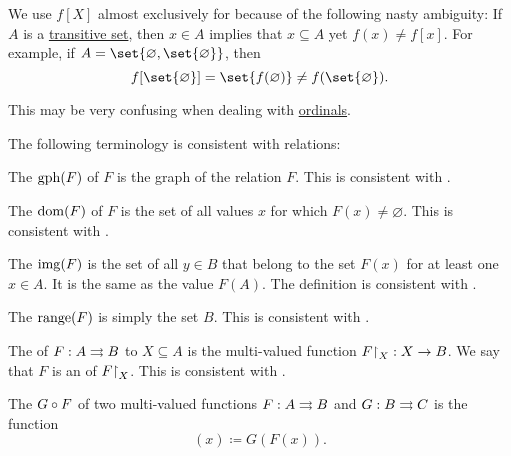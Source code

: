 \begin{definition}
\begin{thmenum}[series=def:multi_valued_function]
    We use \( f[X] \) almost exclusively for  because of the following nasty ambiguity: If \( A \) is a \hyperref[def:transitive_set]{transitive set}, then \( x \in A \) implies that \( x \subseteq A \) yet \( f(x) \neq f[x] \). For example, if \( A = \set{ \varnothing, \set{ \varnothing } } \), then
    \begin{equation*}
      f[\set{ \varnothing }] = \set{ f(\varnothing) } \neq f(\set{ \varnothing }).
    \end{equation*}

    This may be very confusing when dealing with \hyperref[def:ordinal]{ordinals}.
  \end{thmenum}

  The following terminology is consistent with relations:
  \begin{thmenum}[resume=def:multi_valued_function]
     The  \( \operatorname{gph}(F) \) of \( F \) is the graph of the relation \( F \). This is consistent with .

     The  \( \operatorname{dom}(F) \) of \( F \) is the set of all values \( x \) for which \( F(x) \neq \varnothing \). This is consistent with .

     The  \( \operatorname{img}(F) \) is the set of all \( y \in B \) that belong to the set \( F(x) \) for at least one \( x \in A \). It is the same as the value \( F(A) \). The definition is consistent with .

     The  \( \operatorname{range}(F) \) is simply the set \( B \). This is consistent with .

     The  of \( F: A \rightrightarrows B \) to \( X \subseteq A \) is the multi-valued function \( F{\upharpoonright}_{X}: X \rightarrow B \). We say that \( F \) is an  of \( F{\upharpoonright}_{X} \). This is consistent with .

     The  \( G \mathbin \circ F \) of two multi-valued functions \( F: A \rightrightarrows B \) and \( G: B \rightrightarrows C \) is the function
    \begin{equation*}
      [G \bincirc F](x) \coloneqq G(F(x)).
    \end{equation*}


\end{thmenum}
\end{definition}
